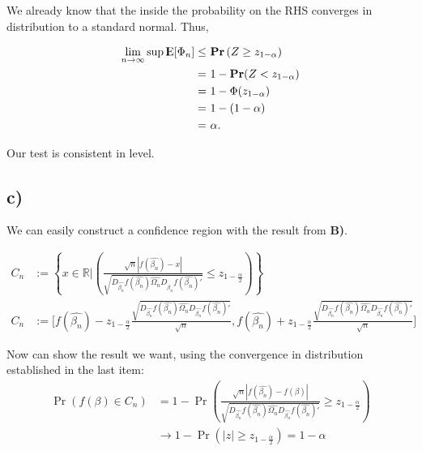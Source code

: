\documentclass[12pt]{paper}
\newcommand{\E}{{\rm I\kern-.3em E}}
\begin{document}
We already know that the inside the probability on the RHS converges in distribution to a standard normal. Thus,

\begin{align*}
\lim_{n \to \infty} \sup \E[\Phi_n]  \leq& ~\textbf{Pr}\left(Z \geq z_{1-\alpha} \right)\\
=&~1-\textbf{Pr}(Z<z_{1-\alpha})\\
=&~1-\Phi(z_{1-\alpha})\\
=&~1-(1-\alpha)\\
=&~\alpha.
\end{align*}


Our test is consistent in level.



\subsection*{c)}


We can easily construct a confidence region with the result from \textbf{B)}.

\begin{equation}
\begin{split}
C_n&:=\left \{ 
x \in \mathbb{R}|
\left(
\frac{\sqrt{n}|f(\hat{\beta_n})-x|}{\sqrt{D_{\hat{\beta_n}}f(\hat{\beta_n}) \hat{\Omega_n} D_{\hat{\beta_n}}f(\hat{\beta_n})'}}
\leq
z_{1-\frac{\alpha}{2}}
\right)
\right \}\\
C_n&:=\Big[f(\hat{\beta_n})- z_{1-\frac{\alpha}{2}} \frac{\sqrt{D_{\hat{\beta_n}}f(\hat{\beta_n}) \hat{\Omega_n} D_{\hat{\beta_n}}f(\hat{\beta_n})'}}{\sqrt{n}}, 
f(\hat{\beta_n})+ z_{1-\frac{\alpha}{2}} \frac{\sqrt{D_{\hat{\beta_n}}f(\hat{\beta_n}) \hat{\Omega_n} D_{\hat{\beta_n}}f(\hat{\beta_n})'}}{\sqrt{n}}\Big]
\end{split}
\end{equation}

Now can show the result we want, using the convergence in distribution established in the last item:
\begin{equation}
\begin{split}
\Pr(f(\beta)\in C_n)&=1-\Pr\left(
\frac{\sqrt{n}|f(\hat{\beta_n})-f(\beta)|}{\sqrt{D_{\hat{\beta_n}}f(\hat{\beta_n}) \hat{\Omega_n} D_{\hat{\beta_n}}f(\hat{\beta_n})'}}
\ge
z_{1-\frac{\alpha}{2}}
\right)\\
&\to 1-\Pr(|z|\ge z_{1-\frac{\alpha}{2}})=1-\alpha\\
\end{split}
\end{equation}
\end{document}

